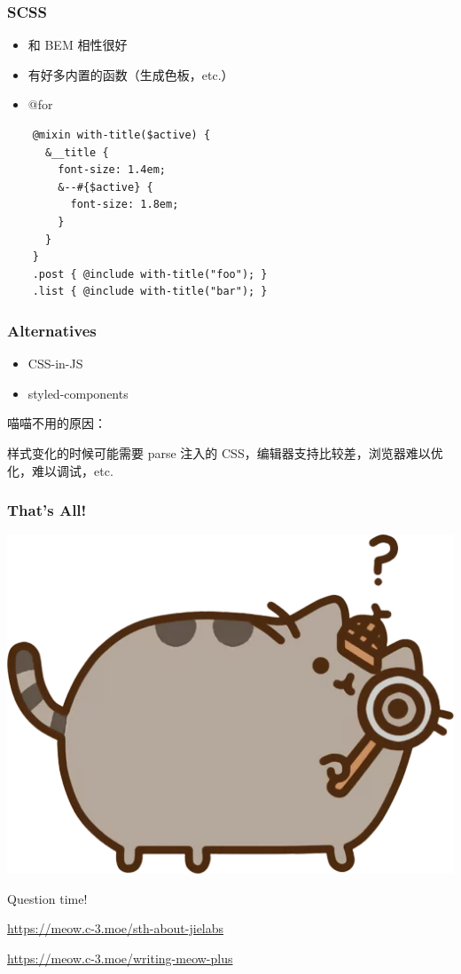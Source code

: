 \documentclass[UTF-8]{ctexbeamer}
\begin{document}
\begin{frame}[fragile]
  \frametitle{SCSS}

  \begin{itemize}
    \item 和 BEM 相性很好
    \item 有好多内置的函数（生成色板，etc.）
    \item @for
  \end{itemize}

  \vspace{1em}
  \pause

  \begin{verbatim}
    @mixin with-title($active) {
      &__title {
        font-size: 1.4em;
        &--#{$active} {
          font-size: 1.8em;
        }
      }
    }
    .post { @include with-title("foo"); }
    .list { @include with-title("bar"); }
  \end{verbatim}
\end{frame}

\begin{frame}
  \frametitle{Alternatives}

  \begin{itemize}
    \item CSS-in-JS
    \item styled-components
  \end{itemize}

  \vspace{2em}
  \pause

  喵喵不用的原因：
  
  样式变化的时候可能需要 parse 注入的 CSS，编辑器支持比较差，浏览器难以优化，难以调试，etc.
\end{frame}

\begin{frame}
  \frametitle{That's All!}

  \begin{center}
    \includegraphics[width=.5\textwidth]{assets/look.png}

    Question time!
  \end{center}

  \url{https://meow.c-3.moe/sth-about-jielabs}

  \url{https://meow.c-3.moe/writing-meow-plus}
\end{frame}
\end{document}
